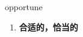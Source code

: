 
\begin{frame}
{\huge opportune}
\begin{center}
\begin{enumerate}\Large
  \item \textbf{合适的，恰当的}
\end{enumerate}
\end{center}
\end{frame}
